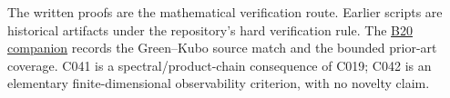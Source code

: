 \documentclass[11pt,a4paper]{article}
\begin{document}
The written proofs are the mathematical verification route. Earlier
scripts are historical artifacts under the repository's hard
verification rule. The
\href{../docs/batches/B20/susceptibility-source-companion.md}{B20
companion} records the Green--Kubo source match and the bounded
prior-art coverage. C041 is a spectral/product-chain consequence of
C019; C042 is an elementary finite-dimensional observability criterion,
with no novelty claim.
\end{document}
